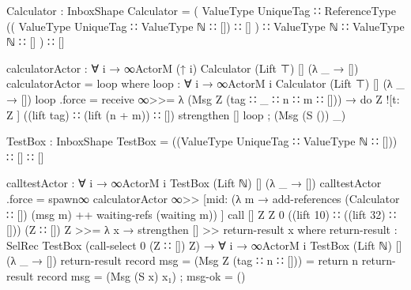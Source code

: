 \begin{code}
Calculator : InboxShape
Calculator = (
  ValueType UniqueTag ∷
  ReferenceType ((
    ValueType UniqueTag ∷
    ValueType ℕ ∷ []) ∷ []
  ) ∷
  ValueType ℕ ∷
  ValueType ℕ ∷ []
  ) ∷ []

calculatorActor : ∀ {i} → ∞ActorM (↑ i) Calculator (Lift ⊤) [] (λ _ → [])
calculatorActor = loop
  where
    loop : ∀ {i} → ∞ActorM i Calculator (Lift ⊤) [] (λ _ → [])
    loop .force = receive ∞>>= λ {
      (Msg Z (tag ∷ _ ∷ n ∷ m ∷ [])) → do
        Z ![t: Z ] ((lift tag) ∷ (lift (n + m)) ∷ [])
        strengthen []
        loop
      ; (Msg (S ()) _) }

TestBox : InboxShape
TestBox = ((ValueType UniqueTag ∷ ValueType ℕ ∷ [])) ∷ [] ∷ []

calltestActor : ∀ {i} → ∞ActorM i TestBox (Lift ℕ) [] (λ _ → [])
calltestActor .force = spawn∞ calculatorActor ∞>>
                       [mid: (λ m → add-references (Calculator ∷ []) (msg m) ++
                                    waiting-refs (waiting m)) ]
                         call [] Z Z 0
                           ((lift 10) ∷ ((lift 32) ∷ []))
                           (Z ∷ []) Z >>=
                       λ x → strengthen [] >>
                       return-result x
  where
    return-result : SelRec TestBox (call-select 0 (Z ∷ []) Z) →
                    ∀ {i} → ∞ActorM i TestBox (Lift ℕ) [] (λ _ → [])
    return-result record { msg = (Msg Z (tag ∷ n ∷ [])) } = return n
    return-result record { msg = (Msg (S x) x₁) ; msg-ok = () }

\end{code}